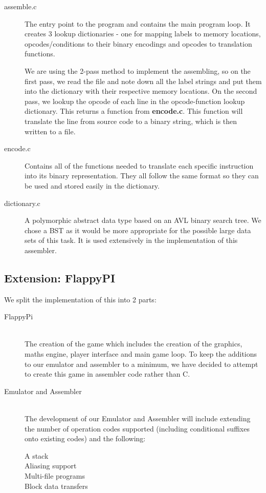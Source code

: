 \documentclass[11pt]{article}
\begin{document}
\begin{description}
\item[assemble.c]
The entry point to the program and contains the main program loop. It creates 3 lookup dictionaries - one for mapping labels to memory locations, opcodes/conditions to their binary encodings and opcodes to translation functions. 

We are using the 2-pass method to implement the assembling, so on the first pass, we read the file and note down all the label strings and put them into the dictionary with their respective memory locations. On the second pass, we lookup the opcode of each line in the opcode-function lookup dictionary. This returns a function from \textbf{encode.c}. This function will translate the line from source code to a binary string, which is then written to a file.

\item[encode.c]
Contains all of the functions needed to translate each specific instruction into its binary representation. They all follow the same format so they can be used and stored easily in the dictionary.

\item[dictionary.c]
A polymorphic abstract data type based on an AVL binary search tree. We chose a BST as it would be more appropriate for the possible large data sets of this task. It is used extensively in the implementation of this assembler.

\end{description}

\subsection{Extension: FlappyPI}

We split the implementation of this into 2 parts:
\begin{description}

\item[FlappyPi] \hfill \\
	The creation of the game which includes the creation of the graphics, maths engine, player interface and main game loop. To keep the additions to our emulator and assembler to a minimum, we have decided to attempt to create this game in assembler code rather than C.

\item[Emulator and Assembler] \hfill \\
	The development of our Emulator and Assembler will include extending the number of operation codes supported (including conditional suffixes onto existing codes) and the following:
	\begin{description}
	\item[A stack]
		
	\item[Aliasing support] 
	\item[Multi-file programs]
	\item[Block data transfers]
	\end{description}
	
\end{description}
\end{document}
